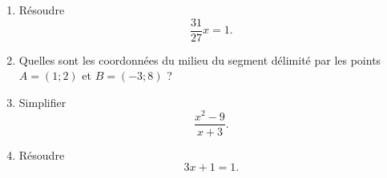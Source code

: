 
\begin{exercice}\label{exoSeconde-0041}

    \begin{multicols}{2}
    \begin{enumerate}
        \item
            Résoudre
            \begin{equation}
                \frac{ 31 }{ 27 }x=1.
            \end{equation}
        \item
            Quelles sont les coordonnées du milieu du segment délimité par les points \( A=(1;2)\) et \( B=(-3;8)\) ?
        \item
            Simplifier
            \begin{equation}
                \frac{ x^2-9 }{ x+3 }.
            \end{equation}
        \item
            Résoudre
            \begin{equation}
                3x+1=1.
            \end{equation}
    \end{enumerate}
    \end{multicols}

\end{exercice}
